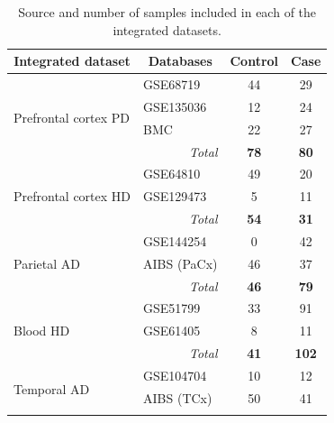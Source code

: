 \begin{table}[ht]
\centering
\caption{Source and number of samples included in each of the integrated datasets.}
\label{tab:integrated-sets}
\begin{tabular}{llcc}
\hline
\multicolumn{1}{c}{\textbf{Integrated dataset}} & \multicolumn{1}{c}{\textbf{Databases}} & \textbf{Control} & \textbf{Case} \\ \hline
\multirow{4}{*}{Prefrontal cortex PD} & GSE68719                           & 44           & 29           \\
                                      & GSE135036                          & 12           & 24           \\
                                      & BMC                       & 22           & 27           \\ \cline{3-4} 
                                      & \multicolumn{1}{r}{\textit{Total}} & \textbf{78}  & \textbf{80}  \\
\multirow{3}{*}{Prefrontal cortex HD} & GSE64810                           & 49           & 20           \\
                                      & GSE129473                          & 5            & 11           \\ \cline{3-4} 
                                      & \multicolumn{1}{r}{\textit{Total}} & \textbf{54}  & \textbf{31}  \\
\multirow{3}{*}{Parietal AD}          & GSE144254                          & 0            & 42           \\
                                      & AIBS (PaCx)                        & 46           & 37           \\ \cline{3-4} 
                                      & \multicolumn{1}{r}{\textit{Total}} & \textbf{46}  & \textbf{79}  \\
\multirow{3}{*}{Blood HD}             & GSE51799                           & 33           & 91           \\
                                      & GSE61405                           & 8            & 11           \\ \cline{3-4} 
                                      & \multicolumn{1}{r}{\textit{Total}} & \textbf{41}  & \textbf{102} \\
\multirow{3}{*}{Temporal AD}          & GSE104704                          & 10           & 12           \\
                                      & AIBS (TCx)                         & 50           & 41           \\ \cline{3-4} 

\end{tabular}
\end{table}

